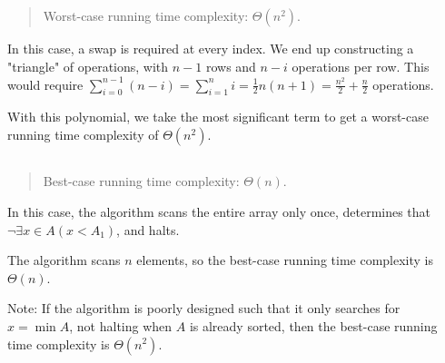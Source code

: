 \documentclass[12pt]{article}
\theoremstyle{definition}
\begin{document}
\subsection{}

\begin{quote}
  Worst-case running time complexity: $\Theta (n^2)$.
\end{quote}

In this case, a swap is required at every index. We end up
constructing a "triangle" of operations, with $n - 1$ rows and $n - i$
operations per row. This would require $\sum_{i = 0}^{n - 1} (n - i)
= \sum_{i = 1}^{n} i = \frac{1}{2}n(n + 1) = \frac{n^2}{2} +
\frac{n}{2}$ operations.

With this polynomial, we take the most significant term to get a
worst-case running time complexity of $\Theta (n^2)$.

\subsection{}

\begin{quote}
  Best-case running time complexity: $\Theta (n)$.
\end{quote}

In this case, the algorithm scans the entire array only once,
determines that $\neg \exists x \in A (x < A_1)$, and halts.

The algorithm scans $n$ elements, so the best-case running time complexity is
$\Theta (n)$.

Note: If the algorithm is poorly designed such that it only searches
for $x = \min A$, not halting when $A$ is already sorted, then the
best-case running time complexity is $\Theta (n^2)$.
\end{document}
